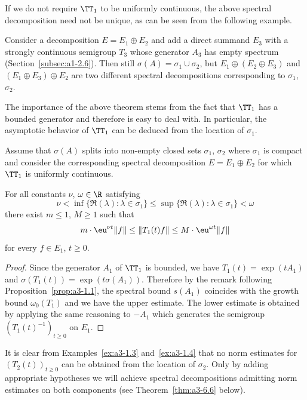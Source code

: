 \begin{example*}
If we do not require $\TT_{1}$ to be uniformly continuous, the above spectral decomposition need not be unique, as can be seen from the following example. 

Consider a decomposition $E = E_{1} \oplus E_{2}$ and add a direct summand $E_{3}$ with a strongly continuous semigroup $T_{3}$ whose generator $A_{3}$ has empty spectrum (\eg Section~\ref{subsec:a1-2.6}).
Then still $\sigma(A) = \sigma_{1} \cup \sigma_{2}$, but $E_{1} \oplus (E_{2} \oplus E_{3})$ and $(E_{1} \oplus E_{3}) \oplus E_{2}$ are two different spectral decompositions corresponding to $\sigma_{1}$, $\sigma_{2}$.
\end{example*}
The importance of the above theorem stems from the fact that $\TT_{1}$ has a bounded generator and therefore is easy to deal with.
In particular, the asymptotic behavior of\/ $\TT_{1}$ can be deduced from the location of\/ $\sigma_{1}$.
\begin{corollary}\label{cor:a3-3.4}
Assume that $\sigma(A)$ splits into non-empty closed sets $\sigma_{1}$, $\sigma_{2}$ where $\sigma_{1}$ is compact and consider the corresponding spectral decomposition $E = E_{1} \oplus E_{2}$ for which $\TT_{1}$ is uniformly continuous.

For all constants $\nu$, $\omega \in \R$ satisfying
\[
\nu < \inf \{\Re(\lambda) \colon \lambda \in \sigma_{1}\} \leq \sup \{\Re(\lambda) \colon \lambda \in \sigma_{1}\} < \omega
\]
there exist $m \leq 1$, $M \geq 1$ such that
\[
m \cdot \eu^{\nu t}\|f\| \leq \|T_{1}(t)f\| \leq M \cdot \eu^{\omega t}\|f\|
\]
for every $f \in E_{1}$, $t \geq 0$.
\end{corollary}
\begin{proof}
Since the generator $A_{1}$ of\/ $\TT_{1}$ is bounded, we have $T_{1}(t) = \exp(tA_{1})$ and $\sigma(T_{1}(t)) = \exp(t\sigma(A_{1}))$.
Therefore by the remark following Proposition~\ref{prop:a3-1.1}, the spectral bound $s(A_{1})$ coincides with the growth bound $\omega_{0}(T_{1})$ and we have the upper estimate.
The lower estimate is obtained by applying the same reasoning to $-A_{1}$ which generates the semigroup $(T_{1}(t)^{-1})_{t \geq 0}$ on $E_{1}$.
\end{proof}
It is clear from Examples~\ref{ex:a3-1.3} and~\ref{ex:a3-1.4} that no norm estimates for $(T_{2}(t))_{t \geq 0}$ can be obtained from the location of\/ $\sigma_{2}$.
Only by adding appropriate hypotheses we will achieve spectral decompositions admitting norm estimates on both components (see Theorem~\ref{thm:a3-6.6} below).

